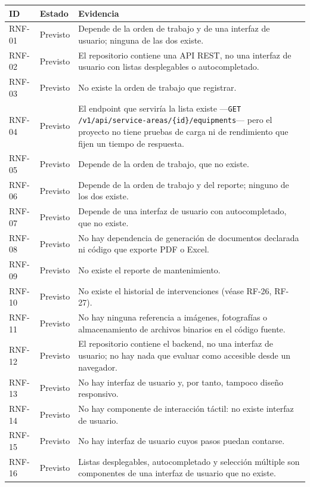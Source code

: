 \documentclass[12pt,varwidth=170mm,border=10pt]{standalone}
\newcommand{\ruta}[1]{\nolinkurl{#1}}
\begin{document}
\begingroup
\small
\begin{center}
\begin{tabular}{|p{1.5cm}|p{2.4cm}|p{10.1cm}|}
\hline
\textbf{ID} & \textbf{Estado} & \textbf{Evidencia} \\
\hline
RNF-01 & Previsto & Depende de la orden de trabajo y de una interfaz de usuario; ninguna de las dos existe. \\
\hline
RNF-02 & Previsto & El repositorio contiene una API REST, no una interfaz de usuario con listas desplegables o autocompletado. \\
\hline
RNF-03 & Previsto & No existe la orden de trabajo que registrar. \\
\hline
RNF-04 & Previsto & El endpoint que serviría la lista existe —\texttt{GET} \ruta{/v1/api/service-areas/{id}/equipments}— pero el proyecto no tiene pruebas de carga ni de rendimiento que fijen un tiempo de respuesta. \\
\hline
RNF-05 & Previsto & Depende de la orden de trabajo, que no existe. \\
\hline
RNF-06 & Previsto & Depende de la orden de trabajo y del reporte; ninguno de los dos existe. \\
\hline
RNF-07 & Previsto & Depende de una interfaz de usuario con autocompletado, que no existe. \\
\hline
RNF-08 & Previsto & No hay dependencia de generación de documentos declarada ni código que exporte PDF o Excel. \\
\hline
RNF-09 & Previsto & No existe el reporte de mantenimiento. \\
\hline
RNF-10 & Previsto & No existe el historial de intervenciones (véase RF-26, RF-27). \\
\hline
RNF-11 & Previsto & No hay ninguna referencia a imágenes, fotografías o almacenamiento de archivos binarios en el código fuente. \\
\hline
RNF-12 & Previsto & El repositorio contiene el backend, no una interfaz de usuario; no hay nada que evaluar como accesible desde un navegador. \\
\hline
RNF-13 & Previsto & No hay interfaz de usuario y, por tanto, tampoco diseño responsivo. \\
\hline
RNF-14 & Previsto & No hay componente de interacción táctil: no existe interfaz de usuario. \\
\hline
RNF-15 & Previsto & No hay interfaz de usuario cuyos pasos puedan contarse. \\
\hline
RNF-16 & Previsto & Listas desplegables, autocompletado y selección múltiple son componentes de una interfaz de usuario que no existe. \\

\end{tabular}
\end{center}
\end{document}
